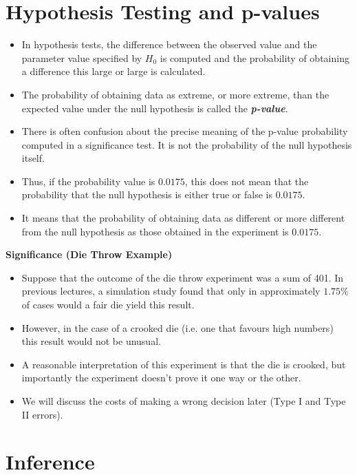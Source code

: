 \documentclass[]{report}
\begin{document}
\section{Hypothesis Testing and p-values}
\begin{itemize}
\item In hypothesis tests, the difference between the observed value and the parameter value specified by $H_0$ is computed and the probability of obtaining a difference this large or large is calculated.
\item The probability of obtaining data as extreme, or more extreme, than the expected value under the null hypothesis is called the \textbf{\emph{p-value}}.
\item There is often confusion about the precise meaning of the p-value probability computed in a significance test. It is not the probability of the null hypothesis itself.
\item Thus, if the probability value is $0.0175$, this does not mean that the probability that the null hypothesis is either true or false is $0.0175$.
\item It means that the probability of obtaining data as different or more different from the null hypothesis as those obtained in the experiment is $0.0175$.
\end{itemize}

\textbf{Significance (Die Throw Example)}
\begin{itemize}
\item Suppose that the outcome of the die throw experiment was a sum of 401. In previous lectures, a simulation study found that only in approximately $1.75\%$ of cases would a fair die yield this result.
\item However, in the case of a crooked die (i.e. one that favours high numbers) this result would not be unusual.
\item A reasonable interpretation of this experiment is that the die is crooked, but importantly the experiment doesn't prove it one way or the other.
\item We will discuss the costs of making a wrong decision later (Type I and Type II errors).
\end{itemize}









\section{Inference}
\end{document}
